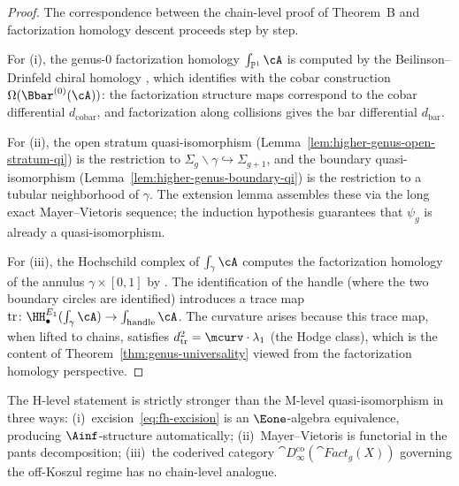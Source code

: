 \begin{proof}
The correspondence between the chain-level proof of Theorem~B and
factorization homology descent proceeds step by step.

For (i), the genus-$0$ factorization homology $\int_{\mathbb{P}^1}\cA$
is computed by the Beilinson--Drinfeld chiral homology
\cite[Theorem~4.3.1]{BD04}, which identifies with the cobar
construction $\Omega(\Bbar^{(0)}(\cA))$: the factorization structure
maps correspond to the cobar differential $d_{\mathrm{cobar}}$,
and factorization along collisions gives the bar differential
$d_{\mathrm{bar}}$.

For (ii), the open stratum quasi-isomorphism
(Lemma~\ref{lem:higher-genus-open-stratum-qi}) is the restriction to
$\Sigma_g \smallsetminus \gamma \hookrightarrow \Sigma_{g+1}$,
and the boundary quasi-isomorphism
(Lemma~\ref{lem:higher-genus-boundary-qi}) is the restriction to
a tubular neighborhood of $\gamma$. The extension lemma assembles
these via the long exact Mayer--Vietoris sequence; the induction
hypothesis guarantees that $\psi_g$ is already a quasi-isomorphism.

For (iii), the Hochschild complex of $\int_\gamma\cA$ computes
the factorization homology of the annulus $\gamma \times [0,1]$
by \cite[Theorem~5.5.3.10]{HA}. The identification of the handle
(where the two boundary circles are identified) introduces a trace
map $\mathrm{tr} \colon \HH^{E_1}_\bullet(\int_\gamma\cA) \to
\int_{\text{handle}}\cA$. The curvature arises because this trace
map, when lifted to chains, satisfies $d_{\mathrm{tr}}^2 =
\mcurv \cdot \lambda_1$ (the Hodge class), which is the content of
Theorem~\ref{thm:genus-universality} viewed from the factorization
homology perspective.
\end{proof}

\begin{remark}
\label{rem:why-homotopy-necessary}
The H-level statement is strictly stronger than the M-level
quasi-isomorphism in three ways:
(i)~excision~\eqref{eq:fh-excision} is an $\Eone$-algebra
equivalence, producing $\Ainf$-structure automatically;
(ii)~Mayer--Vietoris is functorial in the pants decomposition;
(iii)~the coderived category
$\cat{D}^{\mathrm{co}}_\infty(\cat{Fact}_g(X))$ governing
the off-Koszul regime has no chain-level analogue.
\end{remark}


